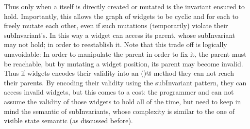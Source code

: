 Thus only when a \Q@WidgetWithInvariant@ itself is directly created or mutated is the invariant ensured to hold. Importantly, this allows the graph of widgets to be cyclic and for each to freely mutate each
other, even if such mutations (temporarily) violate their subInvariant's.
In this way a widget can access its parent, whose subInvariant may not hold; in order to reestablish it.
Note that this trade off is logically unavoidable:
In order to manipulate the parent in order to fix it, the parent must be reachable, but
by mutating a widget position, its parent may become invalid.
Thus if widgets encodes their validity into an \Q@invariant()@ method they can not reach their parents.
By encoding their validity using the subInvariant pattern,
they can access invalid widgets, but this comes to a cost: the programmer 
and can not assume the validity of those widgets to hold all of the time, but
need to keep in mind the semantic of subInvariants, whose complexity is similar to the one of visible state semantic (as discussed before).

